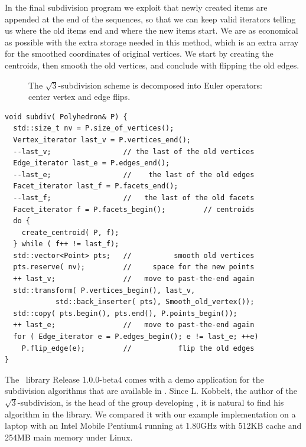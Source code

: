 \noindent
In the final subdivision program we exploit that newly created items
are appended at the end of the sequences, so that we can keep valid
iterators telling us where the old items end and where the new items
start. We are as economical as possible with the extra
storage needed in this method, which is an extra array for the
smoothed coordinates of original vertices. We start by creating the
centroids, then smooth the old vertices, and conclude with flipping
the old edges.

\begin{figure}[tb]
    \caption{The $\sqrt{3}$-subdivision scheme is decomposed into
             Euler operators: center vertex and edge flips.}
    \label{fig:sqrt3_basic}\vspace*{-2mm}
\end{figure}


\begin{lstlisting}
void subdiv( Polyhedron& P) {
  std::size_t nv = P.size_of_vertices();
  Vertex_iterator last_v = P.vertices_end();
  --last_v;                 // the last of the old vertices
  Edge_iterator last_e = P.edges_end();
  --last_e;                 //    the last of the old edges
  Facet_iterator last_f = P.facets_end();
  --last_f;                 //   the last of the old facets
  Facet_iterator f = P.facets_begin();         // centroids
  do {
    create_centroid( P, f);
  } while ( f++ != last_f);
  std::vector<Point> pts;   //          smooth old vertices
  pts.reserve( nv);         //     space for the new points
  ++ last_v;                //   move to past-the-end again
  std::transform( P.vertices_begin(), last_v, 
            std::back_inserter( pts), Smooth_old_vertex());
  std::copy( pts.begin(), pts.end(), P.points_begin());
  ++ last_e;                //   move to past-the-end again
  for ( Edge_iterator e = P.edges_begin(); e != last_e; ++e)
    P.flip_edge(e);         //           flip the old edges
}
\end{lstlisting}\vspace*{-3mm}

\noindent
The \openmesh\ library Release 1.0.0-beta4 comes with a demo
application for the subdivision algorithms that are available in
\openmesh. Since L.  Kobbelt, the author of the
$\sqrt{3}$-subdivision, is the head of the group developing \openmesh,
it is natural to find his algorithm in the library. We compared it
with our example implementation on a laptop with an Intel Mobile
Pentium4 running at 1.80GHz with 512KB cache and 254MB main memory
under Linux.


